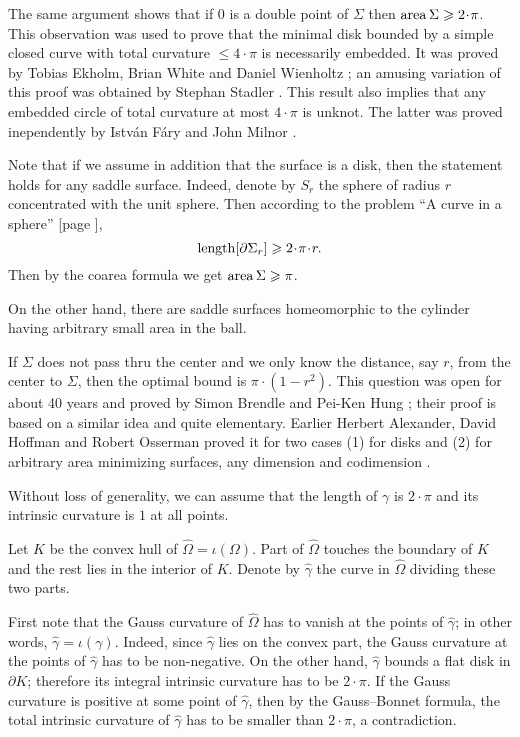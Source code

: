 The same argument shows that if $0$ is a double point
of $\Sigma$ then $\area\Sigma\ge 2\cdot \pi$.
This observation was used to prove 
that the minimal disk bounded by a simple closed curve with total curvature $\le 4\cdot\pi$ 
is necessarily embedded.
It was proved by 
Tobias Ekholm, 
Brian White 
and Daniel Wienholtz
\cite[see][]{EWW};
an amusing variation of this proof
was obtained by 
Stephan Stadler \cite[see][]{stadler-FM}.
This result also implies that any embedded circle of total curvature at most $4\cdot\pi$ is unknot.
The latter was proved inependently by Istv{\'a}n F{\'a}ry \cite[see][]{fary-knot} and  John Milnor \cite[see][]{milnor}.

Note that if we assume in addition that the surface is a disk,
then the statement holds for any saddle surface. 
Indeed, denote by $S_r$ the sphere of radius $r$ concentrated with the unit sphere. 
Then according to the problem ``A curve in a sphere'' [page \pageref{A curve in a sphere}], 
\[\length[\partial\Sigma_r]\ge 2\cdot\pi\cdot r.\]
Then by the coarea formula we get $\operatorname{\rm area}\nolimits\Sigma\geqslant \pi$.

On the other hand, there are saddle surfaces homeomorphic to the cylinder
having arbitrary small area in the ball. 

If $\Sigma$ does not pass thru the center 
and we only know the distance, say $r$, 
from the center to $\Sigma$,
then the optimal bound is $\pi\cdot(1-r^2)$.
This question was open for about 40 years and proved by Simon Brendle and Pei-Ken Hung \cite[see][]{brende-hung};
their proof is based on a similar idea and quite elementary.
Earlier Herbert Alexander, 
David Hoffman
and Robert Osserman 
proved it for two cases (1) for disks and (2) for arbitrary area minimizing surfaces, any dimension and codimension
 \cite[see][]{alexander-osserman,alexander-hoffman-osserman}.






Without loss of generality, we can assume that the length of $\gamma$ is $2{\cdot}\pi$ and its intrinsic curvature is $1$ at all points.

Let $K$ be the convex hull of $\hat\Omega=\iota(\Omega)$.
Part of $\hat\Omega$ touches the boundary of $K$ and the rest lies in the interior of $K$. 
Denote by $\hat\gamma$ the curve in $\hat\Omega$ dividing these two parts.

First note that the Gauss curvature of $\hat\Omega$ has to vanish at the points of $\hat\gamma$;
in other words, $\hat\gamma=\iota(\gamma)$.
Indeed, since $\hat\gamma$ lies on the convex part, 
the Gauss curvature at the points of $\hat\gamma$ has to be non-negative. 
On the other hand, $\hat\gamma$ bounds a flat disk in $\partial K$;
therefore its integral intrinsic curvature has to be $2{\cdot}\pi$.
If the Gauss curvature is positive at some point of $\hat\gamma$, 
then by the Gauss--Bonnet formula, the total intrinsic curvature of $\hat\gamma$ has to be smaller than $2{\cdot}\pi$, a contradiction.

